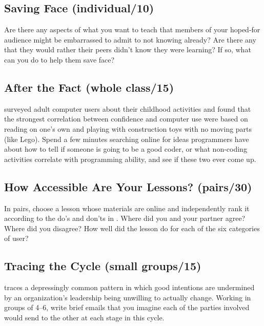 \subsection*{Saving Face (individual/10)}

Are there any aspects of what you want to teach that members of your
hoped-for audience might be embarrassed to admit to not knowing already?
Are there any that they would rather their peers didn't know they were
learning? If so, what can you do to help them save face?

\subsection*{After the Fact (whole class/15)}

\cite{Cutt2017} surveyed adult computer users about their childhood
activities and found that the strongest correlation between confidence
and computer use were based on reading on one's own and playing with
construction toys with no moving parts (like Lego). Spend a few minutes
searching online for ideas programmers have about how to tell if someone
is going to be a good coder, or what non-coding activities correlate
with programming ability, and see if these two ever come up.

\subsection*{How Accessible Are Your Lessons? (pairs/30)}

In pairs, choose a lesson whose materials are online and independently
rank it according to the do's and don'ts in . Where did you and your partner
agree? Where did you disagree? How well did the lesson do for each of
the six categories of user?

\subsection*{Tracing the Cycle (small groups/15)}

\cite{Coco2018} traces a depressingly common pattern in which good
intentions are undermined by an organization's leadership being
unwilling to actually change. Working in groups of 4--6, write brief
emails that you imagine each of the parties involved would send to the
other at each stage in this cycle.

